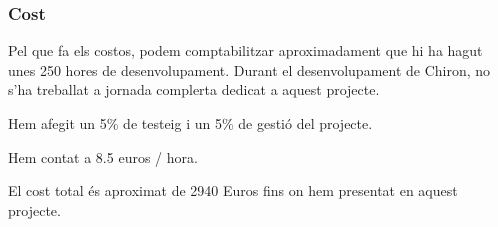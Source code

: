 \subsubsection{Cost} %
\label{ssub:Cost}

Pel que fa els costos, podem comptabilitzar aproximadament que hi ha
hagut unes 250 hores de desenvolupament.  Durant el desenvolupament de
Chiron, no s'ha treballat a jornada complerta dedicat a aquest projecte.

Hem afegit un 5\% de testeig i un 5\% de gestió del projecte.

Hem contat a 8.5 euros / hora.

El cost total és aproximat de 2940 Euros fins on hem presentat en
aquest projecte.


%
